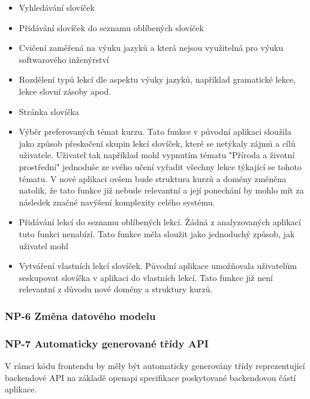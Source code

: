\begin{itemize}
    \item Vyhledávání slovíček
    \item Přidávání slovíček do seznamu oblíbených slovíček
    \item Cvičení zaměřená na výuku jazyků a která nejsou využitelná pro výuku softwarového inženýrství
    \item Rozdělení typů lekcí dle aspektu výuky jazyků, například gramatické lekce, lekce slovní zásoby apod.
    \item Stránka slovíčka
    \item Výběr preferovaných témat kurzu. Tato funkce v původní aplikaci sloužila jako způsob přeskočení skupin lekcí slovíček, které se netýkaly zájmů a cílů uživatele. Uživatel tak například mohl vypnutím tématu "Příroda a životní prostřední" jednoduše ze svého učení vyřadit všechny lekce týkající se tohoto tématu. V nové aplikaci ovšem bude struktura kurzů a domény změněna natolik, že tato funkce již nebude relevantní a její ponechání by mohlo mít za následek značné navýšení komplexity celého systému.
    \item Přidávání lekcí do seznamu oblíbených lekcí. Žádná z analyzovaných aplikací tuto funkci nenabízí. Tato funkce měla sloužit jako jednoduchý způsob, jak uživatel mohl %
    \item Vytváření vlastních lekcí slovíček. Původní aplikace umožňovala uživatelům seskupovat slovíčka v aplikaci do vlastních lekcí. Tato funkce již není relevantní z důvodu nové domény a struktury kurzů.
\end{itemize}

\subsubsection{NP-6 Změna datového modelu}


\subsubsection{NP-7 Automaticky generované třídy API}

V rámci kódu frontendu by měly být automaticky generovány třídy reprezentující backendové API na základě openapi %
specifikace poskytované backendovou částí aplikace.

